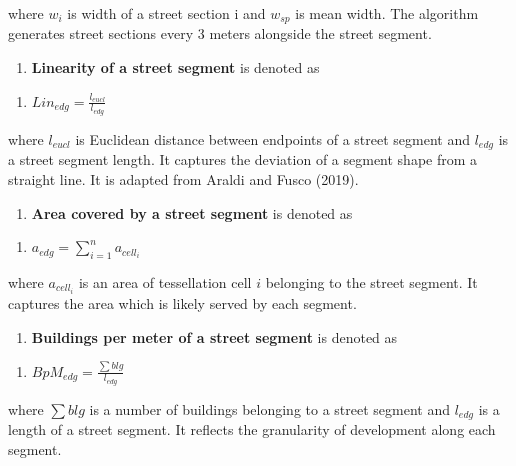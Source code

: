 \documentclass[
  letterpaper,
  DIV=11,
  numbers=noendperiod]{scrartcl}
\providecommand{\tightlist}{%
  \setlength{\itemsep}{0pt}\setlength{\parskip}{0pt}}\usepackage{longtable,booktabs,array}
\begin{document}
where \(w_{i}\) is width of a street section i and \(w_{sp}\) is mean
width. The algorithm generates street sections every 3 meters alongside
the street segment.

\begin{enumerate}
\def\labelenumi{\arabic{enumi}.}
\setcounter{enumi}{20}
\tightlist
\item
  \textbf{Linearity of a street segment} is denoted as
\end{enumerate}

\begin{enumerate}
\def\labelenumi{(\arabic{enumi})}
\setcounter{enumi}{20}
\tightlist
\item
  \(Lin_{edg} = \frac{l_{eucl}}{l_{edg}}\)
\end{enumerate}

where \(l_{eucl}\) is Euclidean distance between endpoints of a street
segment and \(l_{edg}\) is a street segment length. It captures the
deviation of a segment shape from a straight line. It is adapted from
Araldi and Fusco (2019).

\begin{enumerate}
\def\labelenumi{\arabic{enumi}.}
\setcounter{enumi}{21}
\tightlist
\item
  \textbf{Area covered by a street segment} is denoted as
\end{enumerate}

\begin{enumerate}
\def\labelenumi{(\arabic{enumi})}
\setcounter{enumi}{21}
\tightlist
\item
  \(a_{edg} = \sum_{i=1}^{n} a_{cell_i}\)
\end{enumerate}

where \(a_{cell_i}\) is an area of tessellation cell \(i\) belonging to
the street segment. It captures the area which is likely served by each
segment.

\begin{enumerate}
\def\labelenumi{\arabic{enumi}.}
\setcounter{enumi}{22}
\tightlist
\item
  \textbf{Buildings per meter of a street segment} is denoted as
\end{enumerate}

\begin{enumerate}
\def\labelenumi{(\arabic{enumi})}
\setcounter{enumi}{22}
\tightlist
\item
  \(BpM_{edg} = \frac{\sum blg}{l_{edg}}\)
\end{enumerate}

where \(\sum blg\) is a number of buildings belonging to a street
segment and \(l_{edg}\) is a length of a street segment. It reflects the
granularity of development along each segment.
\end{document}
